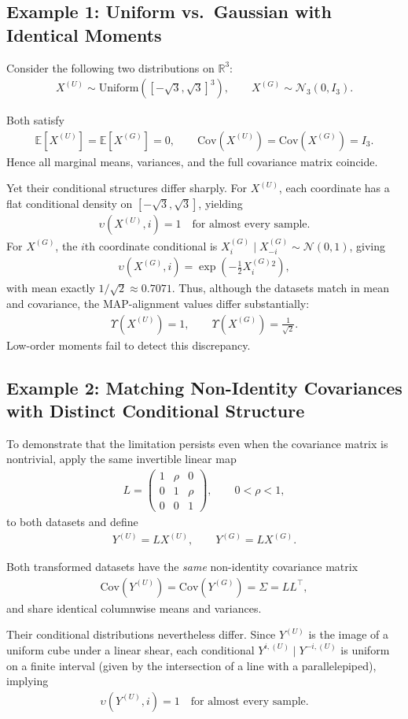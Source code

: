 \documentclass[runningheads]{llncs}
\def\EQSP{3pt}
\newcommand{\cgather}[2][\EQSP]{\begingroup\setlength\abovedisplayskip{#1}\setlength\belowdisplayskip{#1}\begin{gather} #2 \end{gather}\endgroup\noindent}
\begin{document}
\subsection{Example 1: Uniform vs.\ Gaussian with Identical Moments}

Consider the following two distributions on $\mathbb{R}^3$:
\cgather{
X^{(U)} \sim \mathrm{Uniform}([-\sqrt{3},\sqrt{3}]^3),
\qquad
X^{(G)} \sim \mathcal{N}_3(0,I_3).
}

Both satisfy
\cgather{
\mathbb{E}[X^{(U)}]
=
\mathbb{E}[X^{(G)}]
=
0,
\qquad
\mathrm{Cov}(X^{(U)})
=
\mathrm{Cov}(X^{(G)})
=
I_3.
}
Hence all marginal means, variances, and the full covariance matrix
coincide.

Yet their conditional structures differ sharply. For $X^{(U)}$, each
coordinate has a flat conditional density on $[-\sqrt{3},\sqrt{3}]$,
yielding
\cgather{
\upsilon(X^{(U)}, i) = 1
\quad\text{for almost every sample}.
}
For $X^{(G)}$, the $i$th coordinate conditional is
$X^{(G)}_i \mid X^{(G)}_{-i} \sim \mathcal{N}(0,1)$, giving
\cgather{
\upsilon(X^{(G)}, i)
=
\exp\!\left(-\tfrac12 X^{(G)}_i{}^2\right),
}
with mean exactly $1/\sqrt{2}\approx0.7071$. Thus, although the datasets match in mean
and covariance, the MAP-alignment values differ substantially:
\cgather{
\Upsilon(X^{(U)}) = 1,
\qquad
\Upsilon(X^{(G)}) = \frac{1}{\sqrt{2}}.
}
Low-order moments fail to detect this discrepancy.

\subsection{Example 2: Matching Non-Identity Covariances with Distinct Conditional Structure}

To demonstrate that the limitation persists even when the covariance
matrix is nontrivial, apply the same invertible linear map
\cgather{
L
=
\begin{pmatrix}
1 & \rho & 0\\
0 & 1     & \rho\\
0 & 0     & 1
\end{pmatrix},
\qquad 0 < \rho < 1,
}
to both datasets and define
\cgather{
Y^{(U)} = L X^{(U)},
\qquad
Y^{(G)} = L X^{(G)}.
}

Both transformed datasets have the \emph{same} non-identity covariance
matrix
\cgather{
\mathrm{Cov}(Y^{(U)})
=
\mathrm{Cov}(Y^{(G)})
=
\Sigma
=
L L^{\!\top},
}
and share identical columnwise means and variances.

Their conditional distributions nevertheless differ. Since $Y^{(U)}$ is the
image of a uniform cube under a linear shear, each
conditional $Y^{i,(U)} \mid Y^{-i,(U)}$ is uniform on a finite
interval (given by the intersection of a line with a parallelepiped),
implying
\cgather{
\upsilon(Y^{(U)}, i) = 1
\quad\text{for almost every sample}.
}
\end{document}
